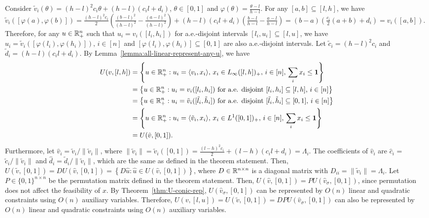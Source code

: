 Consider $\tilde{v}_i(\theta) = (h-l)^2 c_i \theta + (h-l)(c_i l + d_i)$, $\theta\in [0,1]$ and $\varphi(\theta) = \frac{\theta-l}{h-l}$. For any $[a,b]\subseteq [l,h]$, we have
$
	\tilde{v}_i([\varphi(a), \varphi(b)]) = \frac{(h-l)^2 c_i}{2}\left( \frac{(b-l)^2}{(h-l)^2} - \frac{(a-l)^2}{(h-l)^2} \right) + (h-l)(c_i l + d_i) \left( \frac{b-l}{h-l} - \frac{a-l}{h-l} \right) 
	= (b-a)\left( \frac{c_i}{2}(a+b) + d_i \right) = v_i([a,b])$.
Therefore, for any $u\in \mathbb{R}_+^n$ such that $u_i = v_i([l_i, h_i])$ for a.e.-disjoint intervals $[l_i, u_i]\subseteq [l,u]$, we have 
$u_i = \tilde{v}_i([\varphi(l_i), \varphi(h_i)]),\, i\in [n]$
and $[\varphi(l_i), \varphi(h_i) ]\subseteq [0,1]$ are also a.e.-disjoint intervals. Let $\tilde{c}_i = (h-l)^2 c_i$ and $\tilde{d}_i = (h-l)(c_i l + d_i)$. By Lemma~\ref{lemma:all-linear-represent-any-u}, we have
\begin{align*}
	U(v, [l,h])
	&= \left\{ u\in \mathbb{R}_+^n: u_i = \langle v_i, x_i \rangle,\, x_i \in L_{\infty}([l,h])_+,\, i\in [n],\, \sum_i x_i \leq \mathbf{1} \right\} \\
	&= \left\{ u\in \mathbb{R}_+^n: \text{$u_i = v_i([l_i, h_i])$ for a.e. disjoint $[l_i, h_i]\subseteq [l,h]$, $i\in [n]$} \right\} \\
	& = \left\{ u\in \mathbb{R}_+^n: \text{$u_i = \tilde{v}_i([\tilde{l}_i, \tilde{h}_i])$ for a.e. disjoint $[\tilde{l}_i, \tilde{h}_i]\subseteq [0,1]$, $i\in [n]$} \right\} \\
	& = \left\{ u\in \mathbb{R}_+^n: u_i = \langle \tilde{v}_i, x_i \rangle,\, x_i \in L^1([0,1])_+,\, i\in [n],\, \sum_i x_i \leq \mathbf{1} \right\}\\
	& = U(\tilde{v}, [0,1]).
\end{align*}
Furthermore, let $\hat{v}_i = \tilde{v}_i/\|\tilde{v}_i\|$, where $\|\tilde{v}_i\| = \tilde{v}_i([0,1]) =\frac{(l-h)^2c_i}{2} + (l-h)(c_i l + d_i) = \Lambda_i$. 
The coefficients of $\hat{v}_i$ are $\hat{c}_i$ = $\tilde{c}_i / \|\tilde{v}_i\|$ and $\hat{d}_i = \tilde{d}_i / \|\tilde{v}_i \|$, which are the same as defined in the theorem statement. Then,
$U(\tilde{v}, [0,1]) = D U(\hat{v},[0,1]) = \left\{D\hat{u}: \hat{u} \in U(\hat{v}, [0,1]) \right\}$,
where $D \in \mathbb{R}^{n\times n}$ is a diagonal matrix with $D_{ii} = \|\tilde{v}_i\| = \Lambda_i$. 
Let $P\in \{0,1\}^{n\times n}$ be the permutation matrix defined in the theorem statement. Then, 
$U(\hat{v}, [0,1]) = PU(\hat{v}_\sigma, [0,1])$,
since permutation does not affect the feasibility of $x$. By Theorem~\ref{thm:U-conic-rep}, $U(\hat{v}_\sigma, [0,1])$ can be represented by $O(n)$ linear and quadratic constraints using $O(n)$ auxiliary variables.
Therefore, 
$U(v, [l,u]) = U(\tilde{v}, [0,1]) = D P U(\hat{v}_\sigma, [0,1])$
can also be represented by $O(n)$ linear and quadratic constraints using $O(n)$ auxiliary variables. 

